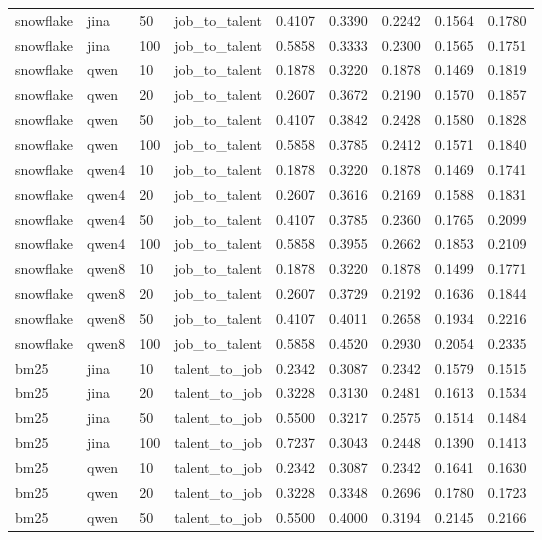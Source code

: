 \begin{table}[t]
\begin{tabular}{lllllllll}
snowflake & jina & 50 & job_to_talent & 0.4107 & 0.3390 & 0.2242 & 0.1564 & 0.1780 \\
snowflake & jina & 100 & job_to_talent & 0.5858 & 0.3333 & 0.2300 & 0.1565 & 0.1751 \\
snowflake & qwen & 10 & job_to_talent & 0.1878 & 0.3220 & 0.1878 & 0.1469 & 0.1819 \\
snowflake & qwen & 20 & job_to_talent & 0.2607 & 0.3672 & 0.2190 & 0.1570 & 0.1857 \\
snowflake & qwen & 50 & job_to_talent & 0.4107 & 0.3842 & 0.2428 & 0.1580 & 0.1828 \\
snowflake & qwen & 100 & job_to_talent & 0.5858 & 0.3785 & 0.2412 & 0.1571 & 0.1840 \\
snowflake & qwen4 & 10 & job_to_talent & 0.1878 & 0.3220 & 0.1878 & 0.1469 & 0.1741 \\
snowflake & qwen4 & 20 & job_to_talent & 0.2607 & 0.3616 & 0.2169 & 0.1588 & 0.1831 \\
snowflake & qwen4 & 50 & job_to_talent & 0.4107 & 0.3785 & 0.2360 & 0.1765 & 0.2099 \\
snowflake & qwen4 & 100 & job_to_talent & 0.5858 & 0.3955 & 0.2662 & 0.1853 & 0.2109 \\
snowflake & qwen8 & 10 & job_to_talent & 0.1878 & 0.3220 & 0.1878 & 0.1499 & 0.1771 \\
snowflake & qwen8 & 20 & job_to_talent & 0.2607 & 0.3729 & 0.2192 & 0.1636 & 0.1844 \\
snowflake & qwen8 & 50 & job_to_talent & 0.4107 & 0.4011 & 0.2658 & 0.1934 & 0.2216 \\
snowflake & qwen8 & 100 & job_to_talent & 0.5858 & 0.4520 & 0.2930 & 0.2054 & 0.2335 \\
bm25 & jina & 10 & talent_to_job & 0.2342 & 0.3087 & 0.2342 & 0.1579 & 0.1515 \\
bm25 & jina & 20 & talent_to_job & 0.3228 & 0.3130 & 0.2481 & 0.1613 & 0.1534 \\
bm25 & jina & 50 & talent_to_job & 0.5500 & 0.3217 & 0.2575 & 0.1514 & 0.1484 \\
bm25 & jina & 100 & talent_to_job & 0.7237 & 0.3043 & 0.2448 & 0.1390 & 0.1413 \\
bm25 & qwen & 10 & talent_to_job & 0.2342 & 0.3087 & 0.2342 & 0.1641 & 0.1630 \\
bm25 & qwen & 20 & talent_to_job & 0.3228 & 0.3348 & 0.2696 & 0.1780 & 0.1723 \\
bm25 & qwen & 50 & talent_to_job & 0.5500 & 0.4000 & 0.3194 & 0.2145 & 0.2166 \\

\end{tabular}
\end{table}
